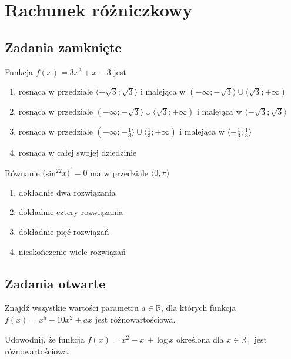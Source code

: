 \setcounter{parc}{0}
\addtocounter{chapc}{1}

\chapter{Rachunek różniczkowy}

\section{Zadania zamknięte}

\zadanie Funkcja $f(x) = 3x^3 + x - 3$ jest
\begin{enumerate}[label=\alph*)]
	\item rosnąca w przedziale $ \langle -\sqrt{3}; \sqrt{3} \rangle $ i malejąca w $ ( -\infty; -\sqrt{3} \rangle \cup \langle \sqrt{3}; +\infty ) $
	\item rosnąca w przedziale $ ( -\infty; -\sqrt{3} \rangle \cup \langle \sqrt{3}; +\infty ) $ i malejąca w $ \langle -\sqrt{3}; \sqrt{3} \rangle $
	\item rosnąca w przedziale $ ( -\infty; -\frac{1}{3} \rangle \cup \langle \frac{1}{3}; +\infty ) $ i malejąca w $ \langle -\frac{1}{3}; \frac{1}{3} \rangle $
	\item rosnąca w całej swojej dziedzinie
\end{enumerate}

\zadanie Równanie $($sin$^22x)^{'}=0$ ma w przedziale $\langle 0, \pi \rangle$
\begin{enumerate}[label=\alph*)]
	\item dokładnie dwa rozwiązania
	\item dokładnie cztery rozwiązania
	\item dokładnie pięć rozwiązań %
	\item nieskończenie wiele rozwiązań
\end{enumerate}

\section{Zadania otwarte}

\zadanie Znajdź wszystkie wartości parametru $a\in\mathbb{R}$, dla których funkcja $f(x) = x^5 - 10x^2 + ax$ jest różnowartościowa.

\zadanie Udowodnij, że funkcja $f(x) = x^2 - x\,+\,$log$\,x$ określona dla $x \in \mathbb{R}_+$ jest różnowartościowa.
